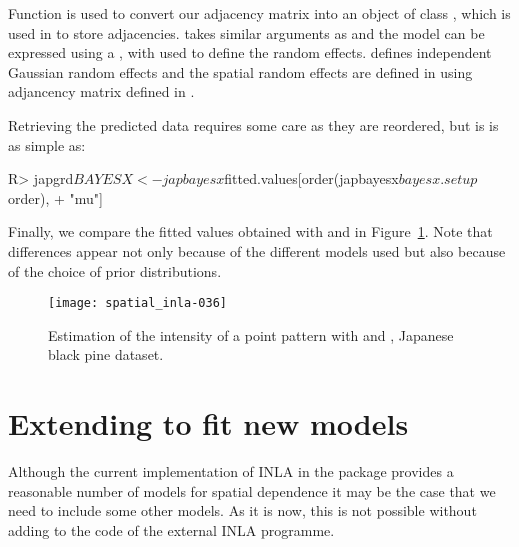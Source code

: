 \documentclass[article]{jss}
\begin{document}
\noindent
Function  is used to convert our adjacency matrix into
an object of class , which is used in  to store 
adjacencies.  takes similar arguments as 
and the model can be expressed using a , with 
used to define the random effects.  defines
independent Gaussian random effects and  the spatial random effects
are defined in 
 using adjancency matrix defined in .

Retrieving the predicted data requires some care as they are reordered,
but is is as simple as:
\begin{Schunk}
\begin{Sinput}
R> japgrd$BAYESX<-japbayesx$fitted.values[order(japbayesx$bayesx.setup$order),
+     "mu"]
\end{Sinput}
\end{Schunk}
\noindent
Finally, we compare the fitted values obtained with  and
 in Figure~\ref{fig:inlabayesx}. Note that differences appear
not only
because of the different models used but also because of the choice of
prior distributions.



\begin{figure}[h]
\begin{center}
\texttt{[image: spatial\_inla-036]}
\caption{Estimation of the intensity of a point pattern with  and , Japanese black pine dataset.}
\label{fig:inlabayesx}
\end{center}
\end{figure}





\section[Extending {R-INLA} to fit new models]{Extending  to fit new models} 

\label{sec:extINLA}


Although the current implementation of INLA in the  package
provides a reasonable number of models for spatial dependence it may be the
case that we need to include some other models. As it is now, this is not
possible without adding to the code of the external INLA programme.
\end{document}
